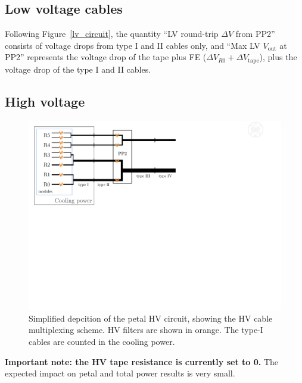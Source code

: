 \subsection{Low voltage cables}

Following Figure~\ref{lv_circuit}, the
quantity ``LV round-trip $\Delta V$ from PP2'' consists of voltage drops from type I and II cables
only, and ``Max LV $V_\text{out}$ at PP2'' represents the voltage drop of the tape plus FE
($\Delta V_{R0} + \Delta V_\text{tape}$), plus the voltage drop of the type I and II cables.

\subsection{High voltage}


\begin{figure}[ht!]
\begin{center}
\includegraphics[width=0.60\linewidth]{figures/HV_cartoon.pdf}
\end{center}
\caption{Simplified depcition of the petal HV circuit, showing the HV cable multiplexing scheme. HV filters are shown
in orange. The type-I cables are counted in the cooling power.}
\label{hv_circuit}
\end{figure}

{ \bf Important note: the HV tape resistance is currently set to 0. } The expected impact on petal
and total power results is very small.

